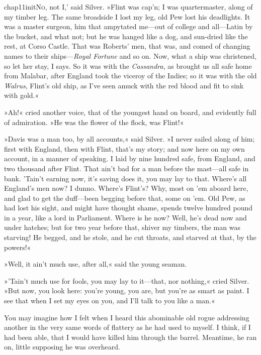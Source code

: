 
\lettrine[ante=`,lines=5,image=true,findent=2pt]{chap11initN}{o}, not I,' said Silver. »Flint was cap'n; I was quartermaster, along of my timber leg. The same broadside I lost my leg, old Pew lost his deadlights. It was a master surgeon, him that ampytated me—out of college and all—Latin by the bucket, and what not; but he was hanged like a dog, and sun-dried like the rest, at Corso Castle. That was Roberts' men, that was, and comed of changing names to their ships—\textit{Royal Fortune} and so on. Now, what a ship was christened, so let her stay, I says. So it was with the \textit{Cassandra}, as brought us all safe home from Malabar, after England took the viceroy of the Indies; so it was with the old \textit{Walrus}, Flint's old ship, as I've seen amuck with the red blood and fit to sink with gold.«

»Ah!« cried another voice, that of the youngest hand on board, and evidently full of admiration. »He was the flower of the flock, was Flint!«

»Davis was a man too, by all accounts,« said Silver. »I never sailed along of him; first with England, then with Flint, that's my story; and now here on my own account, in a manner of speaking. I laid by nine hundred safe, from England, and two thousand after Flint. That ain't bad for a man before the mast—all safe in bank. 'Tain't earning now, it's saving does it, you may lay to that. Where's all England's men now? I dunno. Where's Flint's? Why, most on 'em aboard here, and glad to get the duff—been begging before that, some on 'em. Old Pew, as had lost his sight, and might have thought shame, spends twelve hundred pound in a year, like a lord in Parliament. Where is he now? Well, he's dead now and under hatches; but for two year before that, shiver my timbers, the man was starving! He begged, and he stole, and he cut throats, and starved at that, by the powers!«

»Well, it ain't much use, after all,« said the young seaman.

»'Tain't much use for fools, you may lay to it—that, nor nothing,« cried Silver. »But now, you look here: you're young, you are, but you're as smart as paint. I see that when I set my eyes on you, and I'll talk to you like a man.«

You may imagine how I felt when I heard this abominable old rogue addressing another in the very same words of flattery as he had used to myself. I think, if I had been able, that I would have killed him through the barrel. Meantime, he ran on, little supposing he was overheard.

